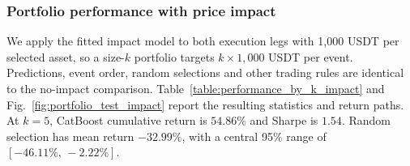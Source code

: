 \documentclass{ieeeaccess}
\begin{document}
\subsubsection{\textcolor{revisionblue}{Portfolio performance with price impact}}
\textcolor{revisionblue}{We apply the fitted impact model to both execution legs with 1{,}000 USDT per selected asset, so a size-$k$ portfolio targets $k\times1{,}000$ USDT per event. Predictions, event order, random selections and other trading rules are identical to the no-impact comparison. Table~\ref{table:performance_by_k_impact} and Fig.~\ref{fig:portfolio_test_impact}\label{firstref:fig:portfolio_test_impact} report the resulting statistics and return paths. At $k=5$, CatBoost cumulative return is $54.86\%$ and Sharpe is $1.54$. Random selection has mean return $-32.99\%$, with a central 95\% range of $[-46.11\%,\,-2.22\%]$.}
\end{document}
